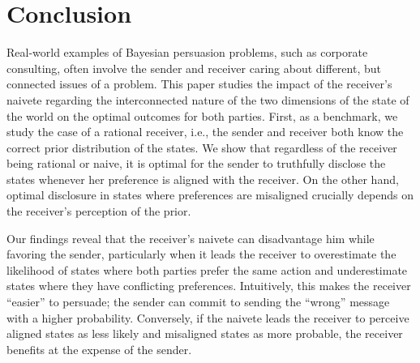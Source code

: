 \documentclass[12pt,english]{article}
\theoremstyle{plain}
\begin{document}
\section{Conclusion}
Real-world examples of Bayesian persuasion problems, such as corporate consulting, often involve the sender and receiver caring about different, but connected issues of a problem. 
This paper studies the impact of the receiver's naivete regarding the interconnected nature of the two dimensions of the state of the world on the optimal outcomes for both parties. 
First, as a benchmark, we study the case of a rational receiver, i.e., the sender and receiver both know the correct prior distribution of the states. 
We show that regardless of the receiver being rational or naive, it is optimal for the sender to truthfully disclose the states whenever her preference is aligned with the receiver. 
On the other hand, optimal disclosure in states where preferences are misaligned crucially depends on the receiver's perception of the prior.

Our findings reveal that the receiver's naivete can disadvantage him while favoring the sender, particularly when it leads the receiver to overestimate the likelihood of states where both parties prefer the same action and underestimate states where they have conflicting preferences.
Intuitively, this makes the receiver ``easier'' to persuade; the sender can commit to sending the ``wrong'' message with a higher probability. 
Conversely, if the naivete leads the receiver to perceive aligned states as less likely and misaligned states as more probable, the receiver benefits at the expense of the sender.

\end{document}
